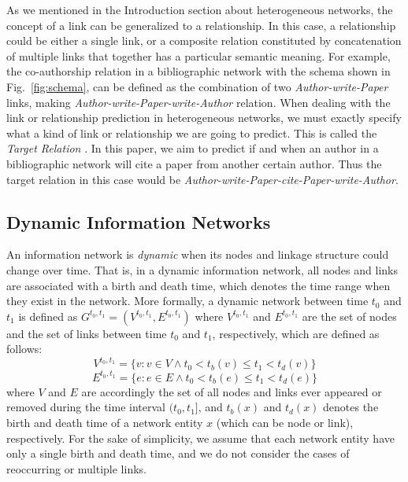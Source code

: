 As we mentioned in the Introduction section about heterogeneous networks, the concept of a link can be generalized to a relationship. In this case, a relationship could be either a single link, or a composite relation constituted by concatenation of multiple links that together has a particular semantic meaning. For example, the co-authorship relation in a bibliographic network with the schema shown in Fig.~\ref{fig:schema}, can be defined as the combination of two \emph{Author-{write}-Paper} links, making \emph{Author-{write}-Paper-{write}-Author} relation. When dealing with the link or relationship prediction in heterogeneous networks, we must exactly specify what a kind of link or relationship we are going to predict. This is called the \emph{Target Relation} \cite{sun2012will}. In this paper, we aim to predict if and when an author in a bibliographic network will cite a paper from another certain author. Thus the target relation in this case would be \emph{Author-{write}-Paper-{cite}-Paper-{write}-Author}.

\subsection{Dynamic Information Networks}
An information network is \emph{dynamic} when its nodes and linkage structure could change over time. That is, in a dynamic information network, all nodes and links are associated with a birth and death time, which denotes the time range when they exist in the network. More formally, a dynamic network between time $t_0$ and $t_1$ is defined as $G^{t_0,t_1}=(V^{t_0,t_1}, E^{t_0,t_1})$ where $V^{t_0,t_1}$ and $E^{t_0,t_1}$ are the set of nodes and the set of links between time $t_0$ and $t_1$, respectively, which are defined as follows:
\[V^{t_0,t_1}=\{v: v\in V \land t_0< t_b(v)\le t_1<t_d(v)\}\]
\[E^{t_0,t_1}=\{e: e\in E \land t_0< t_b(e)\le t_1<t_d(e)\}\]
where $V$ and $E$ are accordingly the set of all nodes and links ever appeared or removed during the time interval $(t_0,t_1]$, and $t_b(x)$ and $t_d(x)$ denotes the birth and death time of a network entity $x$ (which can be node or link), respectively. For the sake of simplicity, we assume that each network entity have only a single birth and death time, and we do not consider the cases of reoccurring or multiple links.

